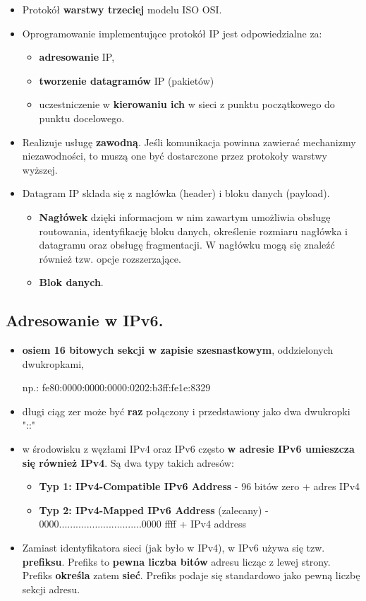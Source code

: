 \documentclass[main.tex]{subfiles}
\begin{document}
    \begin{itemize}
        \item Protokół \textbf{warstwy trzeciej} modelu ISO OSI.
        \item Oprogramowanie implementujące protokół IP jest odpowiedzialne za:
        \begin{itemize}
            \item \textbf{adresowanie} IP,
            \item \textbf{tworzenie datagramów} IP (pakietów)
            \item uczestniczenie w \textbf{kierowaniu ich} w sieci z punktu początkowego do punktu docelowego.
        \end{itemize}
        \item Realizuje usługę \textbf{zawodną}. Jeśli komunikacja powinna zawierać mechanizmy niezawodności, to muszą one być dostarczone przez protokoły warstwy wyższej.
        \item Datagram IP składa się z nagłówka (header) i bloku danych (payload).
        \begin{itemize}
            \item \textbf{Nagłówek} dzięki informacjom w nim zawartym umożliwia obsługę routowania, identyfikację bloku danych, określenie rozmiaru nagłówka i datagramu oraz obsługę fragmentacji. W nagłówku mogą się znaleźć również tzw. opcje rozszerzające.
            \item \textbf{Blok danych}.
        \end{itemize}
    \end{itemize}

    \subsection{Adresowanie w IPv6.}

    \begin{itemize}
        \item \textbf{osiem 16 bitowych sekcji w zapisie szesnastkowym}, oddzielonych dwukropkami,

        np.: fe80:0000:0000:0000:0202:b3ff:fe1e:8329
        \item długi ciąg zer może być \textbf{raz} połączony i przedstawiony jako dwa dwukropki "::"
        \item w środowisku z węzłami IPv4 oraz IPv6 często \textbf{w adresie IPv6 umieszcza się również IPv4}. Są dwa typy takich adresów:
        \begin{itemize}
            \item \textbf{Typ 1: IPv4-Compatible IPv6 Address} - 96 bitów zero + adres IPv4
            \item \textbf{Typ 2: IPv4-Mapped IPv6 Address} (zalecany) - $0000..............................0000$ ffff + IPv4 address
        \end{itemize}
        \item Zamiast identyfikatora sieci (jak było w IPv4), w IPv6 używa się tzw. \textbf{prefiksu}. Prefiks to \textbf{pewna liczba bitów} adresu licząc z lewej strony. Prefiks \textbf{określa} zatem \textbf{sieć}. Prefiks podaje się standardowo jako pewną liczbę sekcji adresu.
    \end{itemize}
\end{document}
